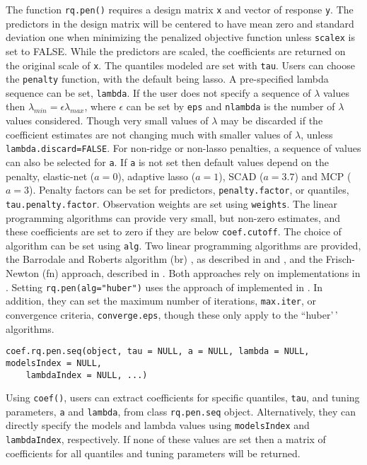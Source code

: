 The function \texttt{rq.pen()} requires a design matrix \texttt{x} and vector of response \texttt{y}. The predictors in the design matrix will be centered to have mean zero and standard deviation one when minimizing the penalized objective function unless \texttt{scalex} is set to FALSE. While the predictors are scaled, the coefficients are returned on the original scale of \texttt{x}. The quantiles modeled are set with \texttt{tau}. Users can choose the \texttt{penalty} function, with the default being lasso. A pre-specified lambda sequence can be set, \texttt{lambda}. If the user does not specify a sequence of \(\lambda\) values then \(\lambda_{min}=\epsilon\lambda_{max}\), where \(\epsilon\) can be set by \texttt{eps} and \texttt{nlambda} is the number of \(\lambda\) values considered. Though very small values of \(\lambda\) may be discarded if the coefficient estimates are not changing much with smaller values of \(\lambda\), unless \texttt{lambda.discard=FALSE}. For non-ridge or non-lasso penalties, a sequence of values can also be selected for \texttt{a}. If \texttt{a} is not set then default values depend on the penalty, elastic-net (\(a=0\)), adaptive lasso (\(a=1\)), SCAD (\(a=3.7\)) and MCP (\(a=3\)). Penalty factors can be set for predictors, \texttt{penalty.factor}, or quantiles, \texttt{tau.penalty.factor}. Observation weights are set using \texttt{weights}. The linear programming algorithms can provide very small, but non-zero estimates, and these coefficients are set to zero if they are below \texttt{coef.cutoff}. The choice of algorithm can be set using \texttt{alg}. Two linear programming algorithms are provided, the Barrodale and Roberts algorithm (br) \citep{br}, as described in \citet{crq1} and \citet{crq2}, and the Frisch-Newton (fn) approach, described in \citet{portnoy1997}. Both approaches rely on implementations in . Setting \texttt{rq.pen(alg="huber")} uses the approach of \citet{huber_cd} implemented in . In addition, they can set the maximum number of iterations, \texttt{max.iter}, or convergence criteria, \texttt{converge.eps}, though these only apply to the ``huber'\,' algorithms.

\begin{verbatim}
coef.rq.pen.seq(object, tau = NULL, a = NULL, lambda = NULL, modelsIndex = NULL,
    lambdaIndex = NULL, ...)
\end{verbatim}

Using \texttt{coef()}, users can extract coefficients for specific quantiles, \texttt{tau}, and tuning parameters, \texttt{a} and \texttt{lambda}, from class \texttt{rq.pen.seq} object. Alternatively, they can directly specify the models and lambda values using \texttt{modelsIndex} and \texttt{lambdaIndex}, respectively. If none of these values are set then a matrix of coefficients for all quantiles and tuning parameters will be returned. \newline

